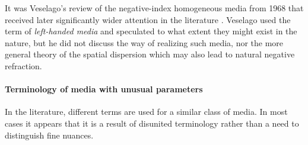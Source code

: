 It was Veselago's review of the negative-index homogeneous media from 1968 that received later significantly wider attention in the literature \cite{veselago1968}. Veselago used %
the term of \textit{left-handed media} and speculated to what extent they might exist in the nature, but he did not discuss the way of realizing such media, nor the more general theory of the spatial dispersion which may also lead to natural negative refraction.

\paragraph{Terminology of media with unusual parameters}  %
In the literature, different terms are used for a similar class of media. In most cases it appears \cite{lindell2001bw} that it is a result of disunited terminology rather than a need to distinguish fine nuances. 

